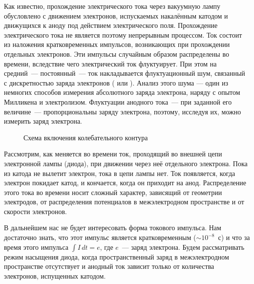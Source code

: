 


Как известно, прохождение электрического тока через вакуумную лампу
обусловлено с движением электронов, испускаемых
накалённым катодом и движущихся к аноду под действием электрического поля.
Прохождение электрического тока не является
поэтому непрерывным процессом. Ток состоит из наложения кратковременных
импульсов, возникающих при прохождении отдельных
электронов. Эти импульсы случайным образом распределены во времени, вследствие
чего электрический ток флуктуирует. При этом на средний~--- постоянный~--- 
ток накладывается флуктуационный шум, связанный с дискретностью заряда электронов
( или ). 
Анализ этого шума --- один из немногих способов измерения абсолютного заряда электрона, 
наряду с опытом Милликена и электролизом.
Флуктуации анодного тока~--- при заданной его
величине~--- пропорциональны заряду электрона, поэтому, исследуя их, можно
измерить заряд электрона.

\begin{figure}[h!]
    \centering
	\caption{Схема включения колебательного контура}
\end{figure}

Рассмотрим, как меняется во времени ток, проходящий во внешней цепи электронной
лампы (диода), при движении через неё
отдельного электрона. Пока из катода не вылетит электрон, тока в цепи лампы нет.
Ток появляется, когда электрон покидает
катод, и кончается, когда он приходит на анод. Распределение этого тока во
времени носит сложный характер, зависящий от
геометрии электродов, от распределения потенциалов в межэлектродном пространстве
и от скорости электронов.

В дальнейшем нас не будет интересовать форма токового импульса. Нам достаточно
знать, что этот импульс является кратковременным (${\sim}10^{-8}$~с) 
и что за время этого импульса $\int I\,dt=e$, где $e$~--- заряд электрона. 
Будем рассматривать режим насыщения диода, когда пространственный заряд в
межэлектродном пространстве отсутствует и анодный
ток зависит только от количества электронов, испущенных катодом.


